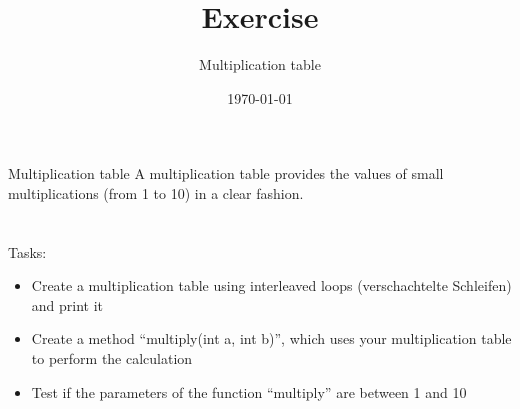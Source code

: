 


\title{Exercise}
\subtitle{Multiplication table}
\date{\today}




\begin{frame}
    \titlepage
\end{frame}

\begin{frame}{Multiplication table}
    A multiplication table provides the values of small multiplications (from 1 to 10) in a clear fashion.\\\\
    \\
    Tasks:
    \begin{itemize}
        \item Create a multiplication table using interleaved loops (verschachtelte Schleifen) and print it
        \item Create a method ``multiply(int a, int b)'', which uses your multiplication table to perform the calculation
        \item Test if the parameters of the function ``multiply'' are between 1 and 10
    \end{itemize}
\end{frame}



